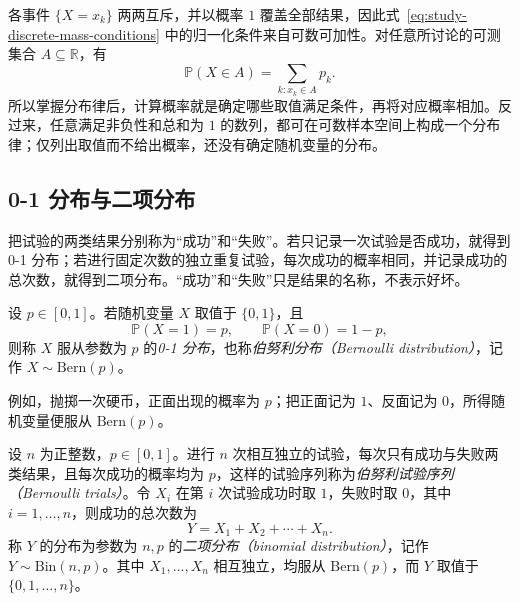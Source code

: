 各事件 $\{X=x_k\}$ 两两互斥，并以概率 $1$ 覆盖全部结果，因此式~\eqref{eq:study-discrete-mass-conditions} 中的归一化条件来自可数可加性。对任意所讨论的可测集合 $A\subseteq\mathbb R$，有
\begin{equation}
  \mathbb P(X\in A)=\sum_{k:x_k\in A}p_k.
  \label{eq:study-discrete-set-probability}
\end{equation}
所以掌握分布律后，计算概率就是确定哪些取值满足条件，再将对应概率相加。反过来，任意满足非负性和总和为 $1$ 的数列，都可在可数样本空间上构成一个分布律；仅列出取值而不给出概率，还没有确定随机变量的分布。

\subsection{0-1 分布与二项分布}
\label{subsec:study-bernoulli-binomial}

把试验的两类结果分别称为“成功”和“失败”。若只记录一次试验是否成功，就得到 0-1 分布；若进行固定次数的独立重复试验，每次成功的概率相同，并记录成功的总次数，就得到二项分布。“成功”和“失败”只是结果的名称，不表示好坏。

\begin{definition}
\label{def:study-bernoulli-distribution}
设 $p\in[0,1]$。若随机变量 $X$ 取值于 $\{0,1\}$，且
\begin{equation}
  \mathbb P(X=1)=p,\qquad \mathbb P(X=0)=1-p,
  \label{eq:study-bernoulli-mass}
\end{equation}
则称 $X$ 服从参数为 $p$ 的\emph{0-1 分布}，也称\emph{伯努利分布（Bernoulli distribution）}，记作 $X\sim\mathrm{Bern}(p)$。
\end{definition}

例如，抛掷一次硬币，正面出现的概率为 $p$；把正面记为 $1$、反面记为 $0$，所得随机变量便服从 $\mathrm{Bern}(p)$。

\begin{definition}
\label{def:study-binomial-distribution}
设 $n$ 为正整数，$p\in[0,1]$。进行 $n$ 次相互独立的试验，每次只有成功与失败两类结果，且每次成功的概率均为 $p$，这样的试验序列称为\emph{伯努利试验序列（Bernoulli trials）}。令 $X_i$ 在第 $i$ 次试验成功时取 $1$，失败时取 $0$，其中 $i=1,\ldots,n$，则成功的总次数为
\begin{equation}
  Y=X_1+X_2+\cdots+X_n.
  \label{eq:study-binomial-sum}
\end{equation}
称 $Y$ 的分布为参数为 $n,p$ 的\emph{二项分布（binomial distribution）}，记作 $Y\sim\mathrm{Bin}(n,p)$。其中 $X_1,\ldots,X_n$ 相互独立，均服从 $\mathrm{Bern}(p)$，而 $Y$ 取值于 $\{0,1,\ldots,n\}$。
\end{definition}

